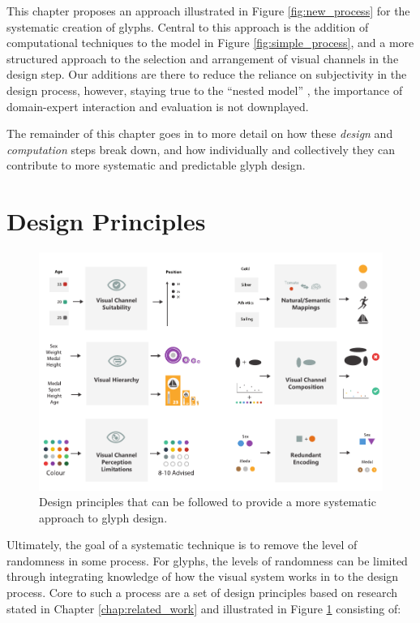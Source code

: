 This chapter proposes an approach illustrated in Figure \ref{fig:new_process} for the systematic creation of glyphs.
Central to this approach is the addition of computational techniques to the model in Figure \ref{fig:simple_process}, and a more structured approach to the selection and arrangement of visual channels in the design step.
Our additions are there to reduce the reliance on subjectivity in the design process, however, staying true to the ``nested model'' \cite{munzner2009nested}, the importance of domain-expert interaction and evaluation is not downplayed.

The remainder of this chapter goes in to more detail on how these \emph{design} and \emph{computation} steps break down, and how individually and collectively they can contribute to more systematic and predictable glyph design.

\section{Design Principles}

\begin{figure}[t!]
\centering
\includegraphics[width=\textwidth]{images/ch3/design_guidelines_2}
\caption{Design principles that can be followed to provide a more systematic approach to glyph design.}
\label{fig:strategies_design_guidelines}
\end{figure}

Ultimately, the goal of a systematic technique is to remove the level of randomness in some process.
For glyphs, the levels of randomness can be limited through integrating knowledge of how the visual system works in to the design process.
Core to such a process are a set of design principles based on research stated in Chapter \ref{chap:related_work} and illustrated in Figure \ref{fig:strategies_design_guidelines} consisting of:


